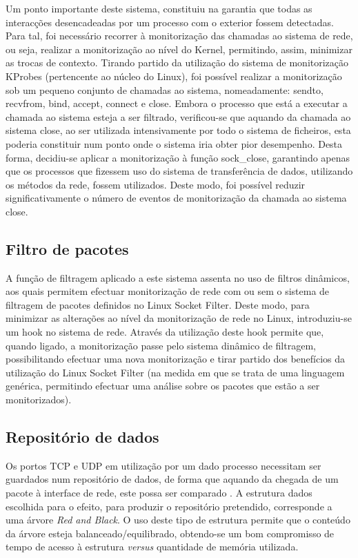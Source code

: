 \documentclass[a4paper]{llncs}
\newcommand{\td}[1]{\todo[inline]{#1}}
\begin{document}
Um ponto importante deste sistema, constituiu na garantia que todas as interacções desencadeadas por um processo com o exterior fossem detectadas. Para tal, foi necessário recorrer à monitorização das chamadas ao sistema de rede, ou seja, realizar a monitorização ao nível do Kernel, permitindo, assim, minimizar as trocas de contexto. Tirando partido da utilização do sistema de monitorização KProbes (pertencente ao núcleo do Linux), foi possível realizar a monitorização sob um pequeno conjunto de chamadas ao sistema, nomeadamente: sendto, recvfrom, bind, accept, connect e close. Embora o processo que está a executar a chamada ao sistema esteja a ser filtrado, verificou-se que aquando da chamada ao sistema close, ao ser utilizada intensivamente por todo o sistema de ficheiros, esta poderia constituir num ponto onde o sistema iria obter pior desempenho. Desta forma, decidiu-se aplicar a monitorização à função sock\_close, garantindo apenas que os processos que fizessem uso do sistema de transferência de dados, utilizando os métodos da rede, fossem utilizados. Deste modo, foi possível reduzir significativamente o número de eventos de monitorização da chamada ao sistema close.

\subsection*{Filtro de pacotes}
\label{sub:packet_filter}

A função de filtragem aplicado a este sistema assenta no uso de filtros dinâmicos, aos quais permitem efectuar monitorização de rede com ou sem o sistema de filtragem de pacotes
definidos no Linux Socket Filter. Deste modo, para minimizar as alterações ao nível da monitorização de rede no Linux, introduziu-se um hook no sistema de rede. Através da utilização deste hook permite que, quando ligado, a monitorização passe pelo sistema dinâmico de filtragem, possibilitando efectuar uma nova monitorização e tirar partido dos benefícios da utilização do Linux Socket Filter (na medida em que se trata de uma linguagem genérica, permitindo efectuar uma análise sobre os pacotes que estão a ser monitorizados).

\subsection*{Repositório de dados}
\label{sub:data_repository}

Os portos TCP e UDP em utilização por um dado processo necessitam ser guardados num repositório de dados, de forma que aquando da chegada de um pacote à interface de rede, este possa ser comparado \td{explicação um pouco mais detalhada}. A estrutura dados escolhida para o efeito, para produzir o repositório pretendido, corresponde a uma árvore \textit{Red and Black}. O uso deste tipo de estrutura permite que o conteúdo da árvore esteja balanceado/equilibrado, obtendo-se um bom compromisso de tempo de acesso à estrutura \textit{versus} quantidade de memória utilizada.
\end{document}
